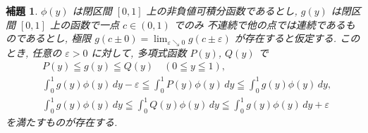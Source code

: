\documentclass[12pt,twoside]{jarticle}
\newcommand\eps{\varepsilon}
\theoremstyle{jplain}
\newtheorem{lemma}[theorem]{補題}
\theoremstyle{jplain}
\theoremstyle{jplain}
\numberwithin{theorem}{section}
\numberwithin{equation}{section}
\numberwithin{figure}{section}
\numberwithin{table}{section}
\begin{document}
\begin{lemma}
\label{lemma:SW}
$\phi(y)$ は閉区間 $[0,1]$ 上の非負値可積分函数であるとし, 
$g(y)$ は閉区間 $[0,1]$ 上の函数で一点 $c\in(0,1)$ でのみ
不連続で他の点では連続であるものであるとし,
極限 $g(c\pm 0)=\lim_{\eps\searrow 0}g(c\pm\eps)$ が存在すると仮定する.
このとき, 任意の $\eps>0$ に対して,  多項式函数 $P(y)$, $Q(y)$ で
\begin{align*}
&
P(y)\leqq g(y)\leqq Q(y) \quad (0\leqq y\leqq 1), 
\\ &
\int_0^1 g(y)\phi(y)\,dy-\eps
\leqq
\int_0^1 P(y)\phi(y)\,dy
\leqq
\int_0^1 g(y)\phi(y)\,dy,
\\ &
\int_0^1 g(y)\phi(y)\,dy
\leqq
\int_0^1 Q(y)\phi(y)\,dy
\leqq
\int_0^1 g(y)\phi(y)\,dy+\eps
\end{align*}
を満たすものが存在する.
\end{lemma}
\end{document}
